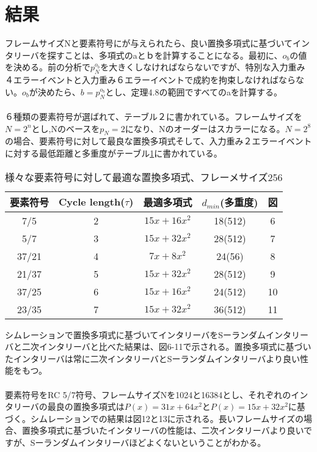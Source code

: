 \documentclass[24 pts]{article}
\begin{document}
\section{結果}
フレームサイズNと要素符号にが与えられたら、良い置換多項式に基づいてインタリーバを探すことは、多項式のaとｂを計算することになる。最初に、$o_b$の値を決める。前の分析で$p_N^{o_b}$を大きくしなければならないですが、特別な入力重み４エラーイベントと入力重み６エラーイベントで成約を拘束しなければならない。$o_b$が決めたら、$b=p_N^{o_b}$とし、定理4.8の範囲ですべてのaを計算する。
\paragraph{}
６種類の要素符号が選ばれて、テーブル２に書かれている。フレームサイズを$N=2^n$とし,Nのベースを$p_N=2$になり、Nのオーダーはスカラーになる。$N=2^8$の場合、要素符号に対して最良な置換多項式そして、入力重み２エラーイベントに対する最低距離と多重度がテーブル\ref{テーブル:2}に書かれている。

\begin{table}[h!]
\begin{center}
\begin{tabular}{|c|c|c|c|c|}
\hline
要素符号 & Cycle length($\tau$) & 最適多項式 & $d_{min}$(多重度) & 図 \\
\hline
7/5 & 2 & $15x+16x^2$ & 18(512) & 6 \\
\hline
5/7 & 3 & $15x+32x^2$ & 28(512) & 7 \\
\hline
37/21 & 4 & $7x+8x^2$ & 24(56) & 8 \\
\hline
21/37 & 5 & $15x+32x^2$ & 28(512) & 9 \\
\hline
37/25 & 6 & $15x+16x^2$ & 24(512) & 10 \\
\hline
23/35 & 7 & $15x+32x^2$ & 36(512) & 11 \\
\hline
\end{tabular}
\caption{様々な要素符号に対して最適な置換多項式、フレーメサイズ256}
\label{テーブル:2}
\end{center}
\end{table}

シムレーションで置換多項式に基づいてインタリーバをSーランダムインタリーバと二次インタリーバと比べた結果は、図6-11で示される。置換多項式に基づいたインタリーバは常に二次インタリーバとSーランダムインタリーバより良い性能をもつ。
\paragraph{}
要素符号をRC 5/7符号、フレームサイズNを1024と16384とし、それぞれのインタリーバの最良の置換多項式は$P(x)=31x+64x^2$と$P(x)=15x+32x^2$に基づく。シムレーションでの結果は図12と13に示される。長いフレームサイズの場合、置換多項式に基づいたインタリーバの性能は、二次インタリーバより良いですが、Sーランダムインタリーバほどよくないということがわかる。
\end{document}
